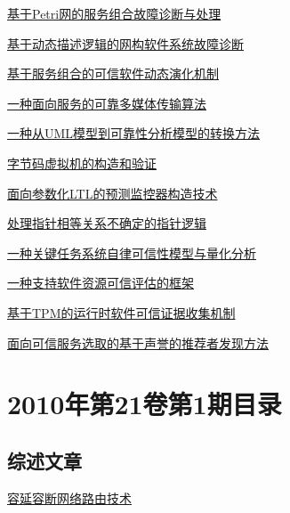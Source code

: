 \documentclass[a4paper]{article}
\begin{document}
\href{http://www.jos.org.cn/ch/reader/download_pdf.aspx?file_no=3790&year_id=2010&quarter_id=2&falg=1}{基于Petri网的服务组合故障诊断与处理}

\href{http://www.jos.org.cn/ch/reader/download_pdf.aspx?file_no=3793&year_id=2010&quarter_id=2&falg=1}{基于动态描述逻辑的网构软件系统故障诊断}

\href{http://www.jos.org.cn/ch/reader/download_pdf.aspx?file_no=3735&year_id=2010&quarter_id=2&falg=1}{基于服务组合的可信软件动态演化机制}

\href{http://www.jos.org.cn/ch/reader/download_pdf.aspx?file_no=3788&year_id=2010&quarter_id=2&falg=1}{一种面向服务的可靠多媒体传输算法}

\href{http://www.jos.org.cn/ch/reader/download_pdf.aspx?file_no=3792&year_id=2010&quarter_id=2&falg=1}{一种从UML模型到可靠性分析模型的转换方法}

\href{http://www.jos.org.cn/ch/reader/download_pdf.aspx?file_no=3794&year_id=2010&quarter_id=2&falg=1}{字节码虚拟机的构造和验证}

\href{http://www.jos.org.cn/ch/reader/download_pdf.aspx?file_no=3738&year_id=2010&quarter_id=2&falg=1}{面向参数化LTL的预测监控器构造技术}

\href{http://www.jos.org.cn/ch/reader/download_pdf.aspx?file_no=3783&year_id=2010&quarter_id=2&falg=1}{处理指针相等关系不确定的指针逻辑}

\href{http://www.jos.org.cn/ch/reader/download_pdf.aspx?file_no=3784&year_id=2010&quarter_id=2&falg=1}{一种关键任务系统自律可信性模型与量化分析}

\href{http://www.jos.org.cn/ch/reader/download_pdf.aspx?file_no=3786&year_id=2010&quarter_id=2&falg=1}{一种支持软件资源可信评估的框架}

\href{http://www.jos.org.cn/ch/reader/download_pdf.aspx?file_no=3789&year_id=2010&quarter_id=2&falg=1}{基于TPM的运行时软件可信证据收集机制}

\href{http://www.jos.org.cn/ch/reader/download_pdf.aspx?file_no=3791&year_id=2010&quarter_id=2&falg=1}{面向可信服务选取的基于声誉的推荐者发现方法}


\section{\textbf{2010年第21卷第1期目录}}
\subsection{综述文章}
\href{http://www.jos.org.cn/ch/reader/download_pdf.aspx?file_no=3689&year_id=2010&quarter_id=1&falg=1}{容延容断网络路由技术}
\end{document}
